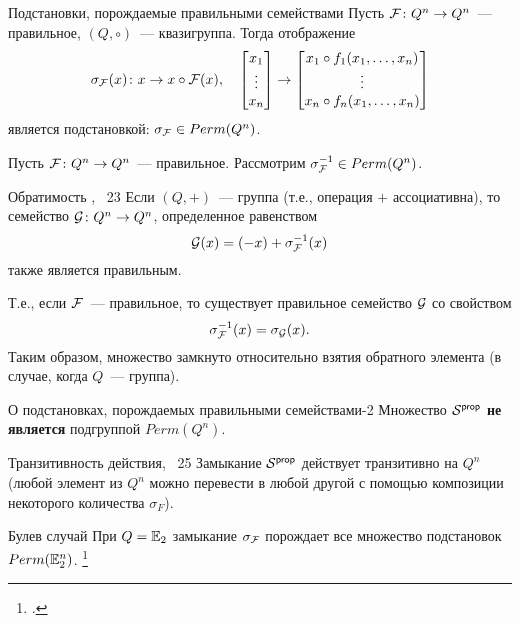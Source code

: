 \begin{frame}{Подстановки, порождаемые правильными семействами}
    Пусть $\mathcal{F} \colon Q^n \to Q^n$~--- правильное, $(Q, \circ)$~--- квазигруппа.
    Тогда отображение
    \[ 
        \sigma_{\mathcal{F}}(x) \colon x \to x \circ \mathcal{F}(x),
        \quad
        \begin{bmatrix}
            x_1 \\
            \vdots \\
            x_n
        \end{bmatrix} 
        \to 
        \begin{bmatrix}
            x_1 \circ f_1(x_1, \ldots, x_n) \\
            \vdots \\
            x_n \circ f_n(x_1, \ldots, x_n)
        \end{bmatrix}
    \]
    является подстановкой: $\sigma_{\mathcal{F}} \in Perm(Q^n)$.
\end{frame}


\begin{frame}
    Пусть $\mathcal{F} \colon Q^n \to Q^n$~--- правильное.
    Рассмотрим $\sigma^{-1}_{\mathcal{F}} \in Perm(Q^n)$.
    \begin{mytheorem}{Обратимость , \thm~23}
        Если $(Q, +)$~--- группа (т.е., операция $+$ ассоциативна), то семейство $\mathcal{G} \colon Q^n \to Q^n$, определенное равенством
        \[
            \mathcal{G}(x) = (-x) + \sigma_{\mathcal{F}}^{-1}(x)
        \]
        также является правильным.
    \end{mytheorem}
    \pause
    Т.е., если $\mathcal{F}$~--- правильное, то существует правильное семейство $\mathcal{G}$ со свойством
    \[
        \sigma^{-1}_{\mathcal{F}}(x) = \sigma_{\mathcal{G}}(x).
    \]
    \pause
    Таким образом, множество  замкнуто относительно взятия обратного элемента (в случае, когда $Q$~--- группа).
\end{frame}


\begin{frame}{О подстановках, порождаемых правильными семействами-2}
    Множество $\mathcal{S}^{\mathsf{prop}}$ \textbf{не является} подгруппой $Perm(Q^n)$.
    
    \pause 
    \begin{mytheorem}{Транзитивность действия, \thm~25}
        Замыкание $\mathcal{S}^{\mathsf{prop}}$ действует транзитивно на $Q^n$ (любой элемент из $Q^n$ можно перевести в любой другой с помощью композиции некоторого количества $\sigma_{F}$).
    \end{mytheorem}
    \pause 
    \begin{mypropos}{Булев случай}
        При $Q = \mathbb{E}_2$ замыкание $\sigma_{\mathcal{F}}$ порождает все множество подстановок $Perm(\mathbb{E}_2^n)$.
        \footcitetext{USOphd}
    \end{mypropos}
\end{frame}


